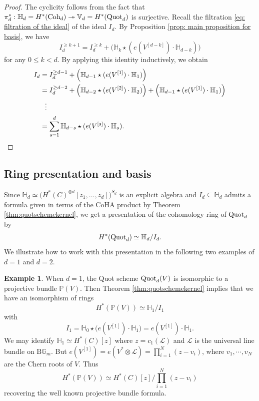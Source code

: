 \documentclass[10pt]{amsart}
\newcommand{\BH}{\mathbb{H}}
\newcommand{\BV}{\mathbb{V}}
\newcommand{\Quot}{\textnormal{Quot}}
\newcommand{\Coh}{\textnormal{Coh}}
\newcommand{\+}{{}^+}
\theoremstyle{definition}
\newtheorem {example}[theorem]{Example}
\theoremstyle {definition}
\theoremstyle {definition}
\begin{document}
\begin{proof}
    The cyclicity follows from the fact that $\pi_d^*:\BH_d=H^*(\Coh_d)\twoheadrightarrow \BV_d=H^*(\Quot_d)$ is surjective. Recall the filtration \eqref{eq: filtration of the ideal} of the ideal $I_d$. By Proposition \ref{prop: main proposition for basis}, we have 
    $$I_d^{\geq k+1}
        =I_d^{\geq k}+\Big(\BH_k\star(e(V^{[d-k]})\cdot\BH_{d-k})\Big)
    $$
    for any $0\leq k<d$. By applying this identity inductively, we obtain
    \begin{align*}
        I_d
        &=I_d^{\geq d-1}+\Big(\BH_{d-1}\star(e(V^{[1]})\cdot\BH_{1})\Big)\\
        &=I_{d}^{\geq d-2}+\Big(\BH_{d-2}\star(e(V^{[2]})\cdot\BH_2)\Big)+\Big(\BH_{d-1}\star(e(V^{[1]})\cdot\BH_{1})\Big)\\
        &\hspace{7
        pt}\vdots\\
        &=\sum_{s=1}^{d} \BH_{d-s}\star(e(V^{[s]})\cdot\BH_{s}).
    \end{align*}

\end{proof}

\subsection{Ring presentation and basis}

Since $\BH_d\simeq \big(H^*(C)^{\otimes d}[z_1,\dots,z_d]\big)^{S_d}$ is an explicit algebra and $I_d\subseteq \BH_d$ admits a formula given in terms of the CoHA product by Theorem \ref{thm:quotschemekernel}, we get a presentation of the cohomology ring of $\Quot_d$ by
$$H^*(\Quot_d)\simeq \BH_d/I_d. 
$$
We illustrate how to work with this presentation in the following two examples of $d=1$ and $d=2$. 



\begin{example} \label{ex: d=1 ring}
When $d=1$, the Quot scheme $\Quot_{d}(V)$ is isomorphic to a projective bundle $\mathbb{P}(V)$. Then Theorem \ref{thm:quotschemekernel} implies that we have an isomorphism of rings 
\[ H^{*}(\mathbb{P}(V)) \simeq \mathbb{H}_1/I_1\] 
with 
\[  I_1= \mathbb{H}_0 \star \big(e(V^{[1]}) \cdot \mathbb{H}_1\big) = e(V^{[1]})\cdot \mathbb{H}_1.\] 
We may identify $\mathbb{H}_1 \simeq H^*(C)[z]$ where $z=c_1(\mathcal{L})$ and $\mathcal{L}$ is the universal line bundle on $\mathrm{B}\mathbb{G}_m$. But $e(V^{[1]}) = e(V^{*} \otimes \mathcal{L}) = \prod_{i=1}^{N}(z-v_i)$, where $v_1,\cdots, v_N$ are the Chern roots of $V$.  Thus \[ H^{*}(\mathbb{P}(V)) \simeq H^*(C)[z]/\prod_{i=1}^N (z-v_i) \] recovering the well known projective bundle formula. 
\end{example}
\end{document}
